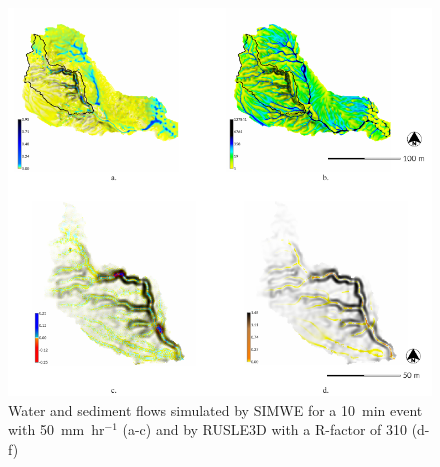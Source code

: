 \documentclass[gmd, manuscript]{copernicus}
\begin{document}
\begin{figure}
\center
\includegraphics[width=\textwidth,height=0.95\textheight,keepaspectratio]{figures/models.pdf}
\caption{Water and sediment flows simulated by SIMWE 
for a 10~\unit{min} event with 50~\unit{mm~hr}$^{-1}$ (a-c)
and by RUSLE3D with a R-factor of 310 (d-f)
}
\label{fig:models}
\end{figure}

\end{document}
